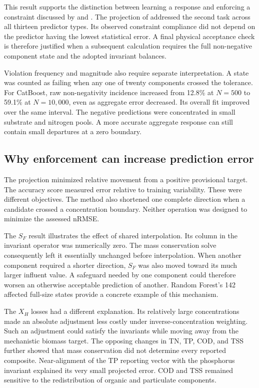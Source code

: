 This result supports the distinction between learning a response and enforcing a constraint discussed by \citet{Kashinath2021} and \citet{Hansen2024}. The projection of \citet{KircherVotsmeier2025} addressed the second task across all thirteen predictor types. Its observed constraint compliance did not depend on the predictor having the lowest statistical error. A final physical acceptance check is therefore justified when a subsequent calculation requires the full non-negative component state and the adopted invariant balances.

Violation frequency and magnitude also require separate interpretation. A state was counted as failing when any one of twenty components crossed the tolerance. For CatBoost, raw non-negativity incidence increased from 12.8\% at $N=500$ to 59.1\% at $N=10{,}000$, even as aggregate error decreased. Its overall fit improved over the same interval. The negative predictions were concentrated in small substrate and nitrogen pools. A more accurate aggregate response can still contain small departures at a zero boundary.

\subsection{Why enforcement can increase prediction error}

The projection minimized relative movement from a positive provisional target. The accuracy score measured error relative to training variability. These were different objectives. The method also shortened one complete direction when a candidate crossed a concentration boundary. Neither operation was designed to minimize the assessed nRMSE.

The $S_F$ result illustrates the effect of shared interpolation. Its column in the invariant operator was numerically zero. The mass conservation solve consequently left it essentially unchanged before interpolation. When another component required a shorter direction, $S_F$ was also moved toward its much larger influent value. A safeguard needed by one component could therefore worsen an otherwise acceptable prediction of another. Random Forest's 142 affected full-size states provide a concrete example of this mechanism.

The $X_H$ losses had a different explanation. Its relatively large concentrations made an absolute adjustment less costly under inverse-concentration weighting. Such an adjustment could satisfy the invariants while moving away from the mechanistic biomass target. The opposing changes in TN, TP, COD, and TSS further showed that mass conservation did not determine every reported composite. Near-alignment of the TP reporting vector with the phosphorus invariant explained its very small projected error. COD and TSS remained sensitive to the redistribution of organic and particulate components.

